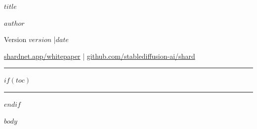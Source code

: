 \documentclass[11pt,a4paper]{article}
\begin{document}
\begin{center}
  {\LARGE\bfseries $title$}\par\vspace{8pt}
  {\large $author$}\par\vspace{4pt}
  {\small Version $version$ \quad|\quad $date$}\par\vspace{4pt}
  {\small
    \href{https://shardnet.app/whitepaper}{shardnet.app/whitepaper} \quad|\quad
    \href{https://github.com/stablediffusion-ai/shard}{github.com/stablediffusion-ai/shard}
  }
\end{center}
\vspace{6pt}\hrule\vspace{10pt}

$if(toc)$
{
  \hypersetup{linkcolor=black}
  \setcounter{tocdepth}{$toc-depth$}
  \tableofcontents
}
\vspace{10pt}\hrule\vspace{14pt}
$endif$

$body$
\end{document}
